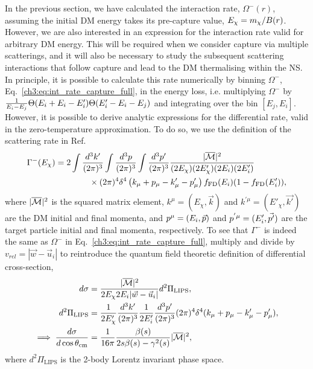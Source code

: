 In the previous section, we have calculated the interaction rate, $\Omega^-(r)$, assuming the initial DM energy takes its pre-capture value, $E_\chi = m_\chi /B(r)$. However, we are also interested in an expression for the interaction rate valid for arbitrary DM energy. This will be required when we consider capture via multiple scatterings, and it will also be necessary to study the subsequent scattering interactions that follow capture and lead to the DM thermalising within the NS.
In principle, it is possible to calculate this rate numerically by binning $\Omega^-$, Eq.~\ref{ch3:eq:int_rate_capture_full}, in the energy loss, i.e. multiplying $\Omega^-$ by $\frac{1}{E_i-E_j}\Theta(E_i+E_i-E_i')\Theta(E_i'-E_i-E_j)$ and integrating over the bin $[E_j,E_i]$. 
However, it is possible to derive analytic expressions for the differential rate, valid in the zero-temperature approximation. To do so, we use the definition of the scattering rate in Ref.~\cite{Reddy:1997yr_Neutrinointeractionshot,Bertoni:2013bsa_dec_DarkMatterThermalization} 
\begin{equation}
    \begin{split}
        \Gamma^-(E_\chi) &= 2\int \frac{d^3k'}{(2\pi)^3}\int \frac{d^3p}{(2\pi)^3}\int \frac{d^3p'}{(2\pi)^3} \frac{|\overline{\mathcal M}|^2}{(2E_\chi)(2E'_\chi)(2E_i)(2E_i')}\\
        &\hspace{4em}\times(2\pi)^4\delta^4\left(k_\mu+p_\mu-k_\mu'-p_\mu'\right) f_{\rm FD}(E_i)(1-f_{\rm FD}(E_i')),
    \end{split}
\label{ch3:eq:scattrate}
\end{equation}
where $|\overline{\mathcal M}|^2$ is the squared matrix element,
$k^\mu=(E_\chi,\vec{k})$ and $k^{'\mu}=(E'_\chi,\vec{k'})$ are the DM initial and final momenta, and $p^\mu=(E_i,\vec{p})$ and $p^{'\mu}=(E_i',\vec{p'})$ are the target particle initial and final momenta, respectively.
To see that $\Gamma^-$ is indeed the same as $\Omega^-$ in Eq.~\ref{ch3:eq:int_rate_capture_full}, multiply and divide by
$v_{rel}=|\vec{w}-\vec{u}_i|$ to reintroduce the quantum field theoretic definition of differential cross-section, 
\begin{align}
    d\sigma & = \frac{|\overline{\mathcal M}|^2}{2 E_\chi 2E_i|\vec{w} - \vec{u}_i|}d^2\Pi_\mathrm{LIPS},\label{ch3:eq:diffxsec}\\
    d^2\Pi_\mathrm{LIPS} &= \frac{1}{2E'_\chi}\frac{d^3 k'}{(2\pi)^3}\frac{1}{ 2E_i'}\frac{d^3 p'}{(2\pi)^3}(2\pi)^4\delta^4(k_\mu + p_\mu - k'_\mu - p'_\mu),\\
    \implies\frac{d\sigma}{d\cos\theta_\mathrm{cm}} &= \frac{1}{16 \pi}\frac{\beta(s)}{2 s \beta(s) - \gamma^2(s)}|\overline{\mathcal M}|^2,
\end{align}
where $d^2\Pi_\mathrm{LIPS}$ is the 2-body Lorentz invariant phase space.


